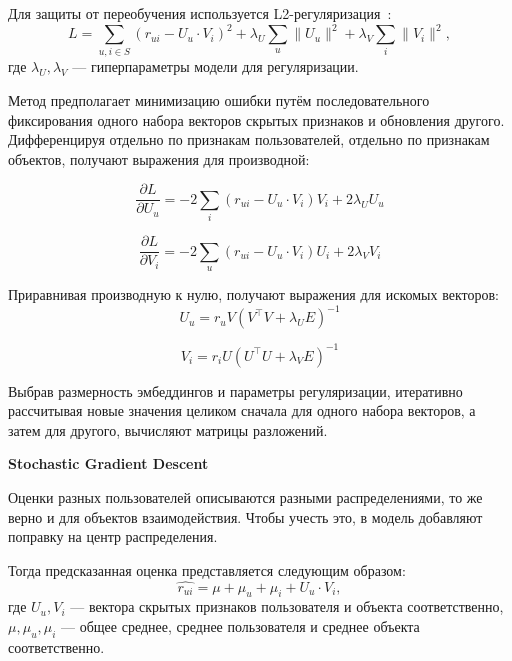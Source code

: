 Для защиты от переобучения используется L2-регуляризация~\cite{l-reg}:
\begin{equation}\label{eq:3}
        L = \sum_{u, i\in S}{(r_{ui} - U_{u} \cdot V_{i}) ^ 2} + \lambda_{U}\sum_{u}{\|U_{u}\| ^ 2} + \lambda_{V}\sum_{i}{\|V_{i}\| ^ 2},
\end{equation}
где $\lambda_{U}, \lambda_{V}$ --- гиперпараметры модели для регуляризации.


Метод предполагает минимизацию ошибки путём последовательного фиксирования одного набора векторов скрытых признаков и обновления другого.
Дифференцируя отдельно по признакам пользователей, отдельно по признакам объектов, получают выражения для производной:

\begin{equation}\label{eq:4}
        \frac{\partial L}{\partial U_{u}} = -2\sum_{i}{(r_{ui} - U_{u} \cdot V_{i})V_{i} + 2 \lambda_{U}U_{u}}
\end{equation}

\begin{equation}\label{eq:5}
        \frac{\partial L}{\partial V_{i}} = -2\sum_{u}{(r_{ui} - U_{u} \cdot V_{i})U_{i} + 2 \lambda_{V}V_{i}}
\end{equation}

Приравнивая производную к нулю, получают выражения для искомых векторов:
\begin{equation}\label{eq:6}
        U_{u} = r_{u}V(V^\intercal V + \lambda_{U} E)^{-1}
\end{equation}

\begin{equation}\label{eq:7}
        V_{i} = r_{i}U(U^\intercal U + \lambda_{V} E)^{-1}
\end{equation}

Выбрав размерность эмбеддингов и параметры регуляризации, итеративно рассчитывая новые значения целиком сначала для одного набора векторов, а затем для другого, вычисляют матрицы разложений.


\vspace{1em}
\textbf{Stochastic Gradient Descent}

Оценки разных пользователей описываются разными распределениями, то же верно и для объектов взаимодействия.
Чтобы учесть это, в модель добавляют поправку на центр распределения.

Тогда предсказанная оценка представляется следующим образом:
\begin{equation}\label{eq:8}
    \hat{r_{ui}} = \mu + \mu_u + \mu_i+ U_{u} \cdot V_{i},
\end{equation}
где $U_{u}, V_{i}$ --- вектора скрытых признаков пользователя и объекта соответственно,
$\mu, \mu_u, \mu_i$ --- общее среднее, среднее пользователя и среднее объекта соответственно.


